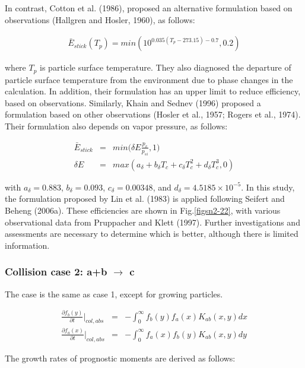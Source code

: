 In contrast, Cotton et al. (1986), proposed an alternative formulation based on observations (Hallgren and Hosler, 1960), as follows:

\begin{eqnarray}
\bar{E}_{stick}(T_{p})=min(10^{0.035(T_{p}-273.15)-0.7},0.2)\label{sn186}
\end{eqnarray}

where $T_{p}$ is particle surface temperature. They also diagnosed the departure of particle surface temperature from the environment due to phase changes in the calculation. In addition, their formulation has an upper limit to reduce efficiency, based on observations. Similarly, Khain and Sednev (1996) proposed a formulation based on other observations (Hosler et al., 1957; Rogers et al., 1974). Their formulation also depends on vapor pressure, as follows:

\begin{eqnarray}
\bar{E}_{stick}&=&min\bigl(\delta E\frac{p_{v}}{p_{si}},1\bigr)\label{sn187}\\
\delta E&=&max(a_{\delta}+b_{\delta}T_{c}+c_{\delta}T_{c}^{2}+d_{\delta}T_{c}^{3},0)\label{sn188}
\end{eqnarray}

with $a_{\delta} = 0.883$, $b_{\delta} = 0.093$, $c_{\delta} = 0.00348$, and $d_{\delta} = 4.5185 \times 10^{-5}$. In this study, the formulation proposed by Lin et al. (1983) is applied following Seifert and Beheng (2006a). These efficiencies are shown in Fig.\ref{figsn2-22}, with various observational data from Pruppacher and Klett (1997). Further investigations and assessments are necessary to determine which is better, although there is limited information.


\subsubsection{Collision case 2: a+b $\rightarrow$ c}
 The case is the same as case 1, except for growing particles.

\begin{eqnarray}
\frac{\partial f_{b}(y)}{\partial t}\Bigr|_{col,abs}&=&-\int_{0}^{\infty}f_{b}(y)f_{a}(x)K_{ab}(x,y)dx\label{sn189}\\
\frac{\partial f_{a}(x)}{\partial t}\Bigr|_{col,abs}&=&-\int_{0}^{\infty}f_{a}(x)f_{b}(y)K_{ab}(x,y)dy\label{sn190}
\end{eqnarray}

The growth rates of prognostic moments are derived as follows:

